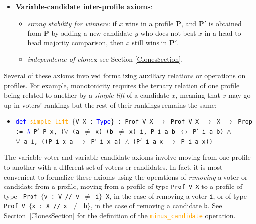 \documentclass[runningheads]{llncs}
\begin{document}
\begin{itemize}
\begin{itemize}
\item \textit{negative involvement}: if $x$ does not win in a profile $\mathbf{P}$, and $\mathbf{P}'$ is obtained from $\mathbf{P}$ by adding a new voter who ranks $x$ as their unique last choice, then $x$ still does not win in $\mathbf{P}'$.\\
\end{itemize}
\item[] \textbf{Variable-candidate inter-profile axioms}:
\begin{itemize}
\item \textit{strong stability for winners}: if $x$ wins in a profile $\mathbf{P}$, and $\mathbf{P}'$ is obtained from $\mathbf{P}$ by adding a new candidate $y$ who does not beat $x$ in a head-to-head majority comparison, then $x$ still wins in $\mathbf{P}'$. 
\item \textit{independence of clones}: see Section \ref{ClonesSection}.
\end{itemize}
\end{itemize}

Several of these axioms involved formalizing auxiliary relations or operations on profiles. For example, monotonicity requires the ternary relation of one profile being related to another by a \textit{simple lift} of a candidate $x$, meaning that $x$ may go up in voters' rankings but the rest of their rankings remains the same:

\begin{itemize}
\item[] \texttt{\textcolor{blue}{def} \textcolor{orange}{simple\_lift} $\{$V X : \textcolor{blue}{Type}$\}$ : Prof V X $\to$ Prof V X $\to$ X $\to$ Prop := 
    \textcolor{blue}{$\lambda$} P$'$ P x, ($\forall$ (a $\neq$ x) (b $\neq$ x) i, P i a b $\leftrightarrow$ P$'$ i a b) 
    $\wedge$  \\$\forall$ a i, ((P i x a $\to$ P$'$ i x a) $\wedge$ (P$'$ i a x $\to$ P i a x))}
 \end{itemize}
The variable-voter and variable-candidate axioms involve moving from one profile to another with a different set of voters or candidates. In fact, it is most convenient to formalize these axioms using the operations of \textit{removing} a voter or candidate from a profile, moving from a profile of type \texttt{Prof V X} to a profile of type  \texttt{ Prof $\{$v : V // v $\neq$ i$\}$ X}, in the case of removing a voter \texttt{i}, or of type \texttt{Prof V $\{$x : X // x $\neq$ b$\}$}, in the case of removing a candidate \texttt{b}. See Section~\ref{ClonesSection} for the definition of the \textcolor{orange}{\texttt{minus\_candidate}} operation.
\end{document}

